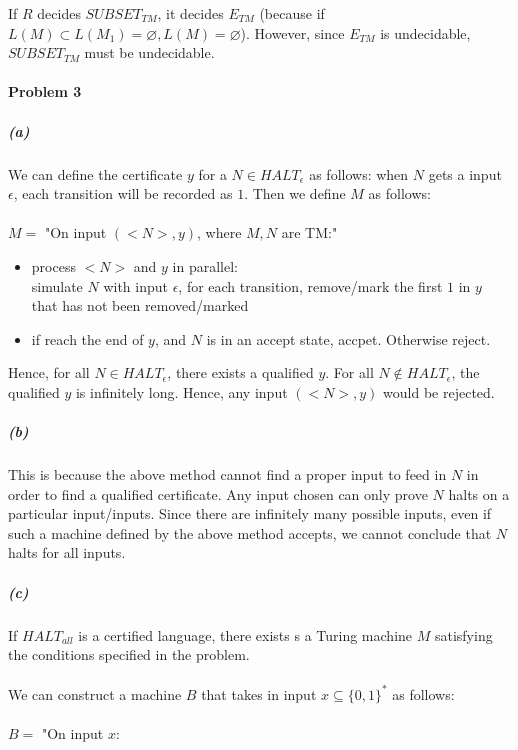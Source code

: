 \documentclass[12pt]{article}
\theoremstyle{definition}
\numberwithin{equation}{section}
\begin{document}
If $R$ decides $SUBSET_{TM}$, it decides $E_{TM}$ (because if $L(M) \subset L(M_1)=\varnothing, L(M)= \varnothing $). However, since $E_{TM}$ is undecidable, $SUBSET_{TM}$ must be undecidable.

\newpage
\paragraph{Problem 3}
\subparagraph{(a)} 
We can define the certificate $y$ for a $N \in HALT_{\epsilon}$ as follows: when $N$ gets a input $\epsilon$, each transition will be recorded as $1$. Then we define $M$ as follows: \\~\\

$M=$ "On input $(<N>,y)$, where $M,N$ are TM:"

\begin{itemize}
\item process $<N>$ and $y$ in parallel: \\
simulate $N$ with input $\epsilon$, for each transition, remove/mark the first $1$ in $y$ that has not been removed/marked
\item if reach the end of $y$, and $N$ is in an accept state, accpet. Otherwise reject.
\end{itemize}
Hence, for all $N \in HALT_{\epsilon}$, there exists a qualified $y$. For all $N \not \in HALT_{\epsilon}$, the qualified $y$ is infinitely long. Hence, any input $(<N>,y)$ would be rejected.

\subparagraph{(b)} 
This is because the above method cannot find a proper input to feed in $N$ in order to find a qualified certificate. Any input chosen can only prove $N$ halts on a particular input/inputs. Since there are infinitely many possible inputs, even if such a machine defined by the above method accepts, we cannot conclude that $N$ halts for all inputs.

\subparagraph{(c)}
If $HALT_{all}$ is a certified language, there exists s a Turing machine $M$ satisfying the conditions specified in the problem. \\~\\
We can construct a machine $B$ that takes in input $x \subseteq \{0,1\}^*$ as follows: \\~\\
$B=$ "On input $x$: \\
\end{document}
